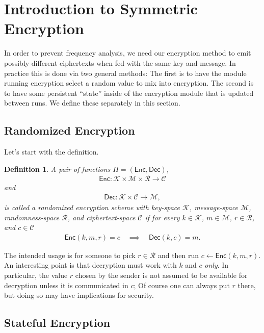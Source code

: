 \documentclass[11pt]{article}
\newtheorem{definition}{Definition}
\newcommand{\msgs}{\mathcal{M}}
\newcommand{\ctxts}{\mathcal{C}}
\newcommand{\keys}{\mathcal{K}}
\newcommand{\rands}{\mathcal{R}}
\newcommand{\Enc}{\mathsf{Enc}}
\newcommand{\Dec}{\mathsf{Dec}}
\begin{document}
\pagebreak

\section{Introduction to Symmetric Encryption}

In order to prevent frequency analysis, we need our encryption method to emit
possibly different ciphertexts when fed with the same key and message. In
practice this is done via two general methods: The first is to have the module
running encryption select a random value to mix into encryption. The second
is to have some persistent ``state'' inside of the encryption module that is
updated between runs. We define these separately in this section.

\subsection{Randomized Encryption}

Let's start with the definition.
\begin{definition}
    A pair of functions $\Pi=(\Enc,\Dec)$,
    \begin{align*}
        \Enc  : \keys\times\msgs\times\rands  \to  \ctxts 
    \end{align*}
    and
    \begin{align*}
        \Dec : \keys\times\ctxts \to \msgs,  
    \end{align*}
    is called a \emph{randomized encryption scheme with key-space $\keys$,
    message-space $\msgs$, randomness-space $\rands$, and ciphertext-space
    $\ctxts$} if for every $k\in\keys$, $m\in\msgs$, $r\in\rands$, and
    $c\in\ctxts$
    \begin{align*}
        \Enc(k,m,r)=c \quad \implies \quad \Dec(k,c)=m.
    \end{align*}
\end{definition}
The intended usage is for someone to pick $r\in\rands$ and then run
$c\gets\Enc(k,m,r)$. An interesting point is that decryption must work with $k$
and $c$ \emph{only}. In particular, the value $r$ chosen by the sender is not
assumed to be available for decryption unless it is communicated in $c$; Of
course one can always put $r$ there, but doing so may have implications for
security.

\subsection{Stateful Encryption}
\end{document}
